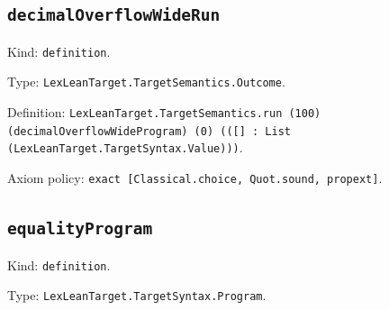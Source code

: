 \documentclass[11pt]{article}
\begin{document}
\subsection*{\texttt{decimalOverflowWideRun}}
\noindent Kind: \texttt{definition}.\par
\noindent Type: \texttt{LexLeanTarget.TargetSemantics.Outcome}.\par
\noindent Definition: \texttt{LexLeanTarget.TargetSemantics.run (100) (decimalOverflowWideProgram) (0) (([] : List (LexLeanTarget.TargetSyntax.Value)))}.\par
\noindent Axiom policy: \texttt{exact [Classical.choice, Quot.sound, propext]}.\par
\subsection*{\texttt{equalityProgram}}
\noindent Kind: \texttt{definition}.\par
\noindent Type: \texttt{LexLeanTarget.TargetSyntax.Program}.\par
\end{document}
